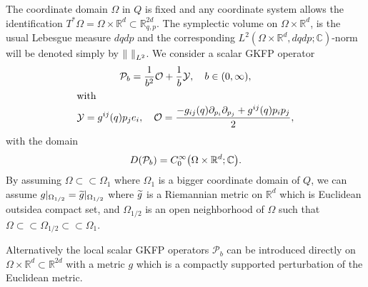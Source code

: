 \documentclass[AHL,Unicode,longabstracts]{cedram}
\newcommand{\C}{\mathbb{C}}
\newcommand{\R}{\mathbb{R}}
\newcommand{\clY}{\mathcal{Y}}
\newcommand{\clO}{\mathcal{O}}
\newcommand{\clP}{\mathcal{P}}
\newcommand\norm[1]{\left\lVert#1\right\rVert}
\let\oldtilde\tilde
\renewcommand*{\tilde}[1]{\mathchoice{\widetilde{#1}}{\widetilde{#1}}{\oldtilde{#1}}{\oldtilde{#1}}}
\let\originalleft\left
\let\originalright\right
\renewcommand{\left}{\mathopen{}\mathclose\bgroup\originalleft}
\renewcommand{\right}{\aftergroup\egroup\originalright}
\begin{document}
The coordinate domain $\Omega$ in $Q$ is fixed and any coordinate system allows the identification $T^*\Omega=\Omega\times\R^d\subset \R^{2d}_{q,p}$. The symplectic volume on $\Omega\times\R^d$, is the usual Lebesgue measure $dqdp$ and the corresponding $L^2(\Omega\times\R^d,dqdp;\C)$-norm will be denoted simply by $\norm{~}_{L^2}$. We consider a scalar GKFP operator
\begin{gather*}
\clP_b  = \frac{1}{b^2} \clO + \frac{1}{b} \clY, \quad b \in (0,\infty),
\\
\intertext{with} 
\clY =g^{ij}(q)p_j e_i,\quad \clO=\frac{-g_{ij}(q)\partial_{p_i}\partial_{p_j}+g^{ij}(q)p_ip_j}{2},
\end{gather*}
with the domain
\begin{align}
D(\clP_b) = C^\infty_0\left(\Omega\times\R^d; \C\right).
\end{align}
By assuming $\Omega\subset\subset\Omega_1$ where $\Omega_1$ is a bigger coordinate domain of $Q$, we can assume $g|_{\Omega_{1/2}}=\tilde{g}|_{\Omega_{1/2}}$ where $\tilde{g}$ is a Riemannian metric on $\R^d$ which is Euclidean outside\linebreak a compact set, and $\Omega_{1/2}$ is an open neighborhood of $\Omega$ such that $\Omega\subset\subset \Omega_{1/2}\subset\subset \Omega_1$.

Alternatively the local scalar GKFP operators $\clP_{b}$ can be introduced directly on $\Omega\times\R^d\subset \R^{2d}$ with a metric $g$ which is a compactly supported perturbation of the Euclidean metric.
\end{document}
